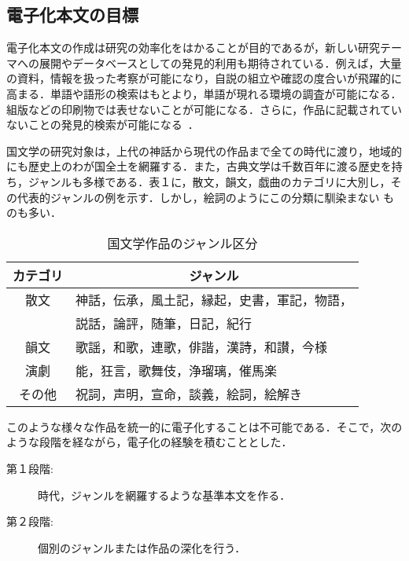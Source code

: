 \subsection{電子化本文の目標}
\label{sec:2.1setu}

電子化本文の作成は研究の効率化をはかることが目的であるが，新しい研究テー
マへの展開やデータベースとしての発見的利用も期待されている．例えば，大量
の資料，情報を扱った考察が可能になり，自説の組立や確認の度合いが飛躍的に
高まる．単語や語形の検索はもとより，単語が現れる環境の調査が可能になる．
組版などの印刷物では表せないことが可能になる．さらに，作品に記載されてい
ないことの発見的検索が可能になる~\cite{kondou:91}．

国文学の研究対象は，上代の神話から現代の作品まで全ての時代に渡り，地域的
にも歴史上のわが国全土を網羅する．また，古典文学は千数百年に渡る歴史を持
ち，ジャンルも多様である．表１に，散文，韻文，戯曲のカテゴリに大別し，そ
の代表的ジャンルの例を示す．しかし，絵詞\yougo のようにこの分類に馴染まない
ものも多い．
\vspace*{-2mm}
\begin{table}[htbp]
  \begin{center}
    \leavevmode
    \caption{国文学作品のジャンル区分}
    \label{tab:hyou1}

    \def\arraystretch{}
    \begin{tabular}{c|l} \hline
      カテゴリ & \multicolumn{1}{c}{ジャンル} \\ \hline
      散文   & 神話，伝承，風土記，縁起，史書，軍記，物語，\\[-1mm]
             & 説話，論評，随筆，日記，紀行 \\ \hline
      韻文   & 歌謡，和歌，連歌，俳諧，漢詩，和讃，今様 \\ \hline
      演劇   & 能，狂言，歌舞伎，浄瑠璃，催馬楽 \\ \hline
      その他 & 祝詞，声明，宣命，談義，絵詞，絵解き \\ \hline
    \end{tabular}
  \end{center}
\end{table}
\vspace*{-2mm}

このような様々な作品を統一的に電子化することは不可能である．そこで，次の
ような段階を経ながら，電子化の経験を積むこととした．

\begin{description}
\item[第１段階:] 時代，ジャンルを網羅するような基準本文を作る．
\item[第２段階:] 個別のジャンルまたは作品の深化を行う．
\end{description}

